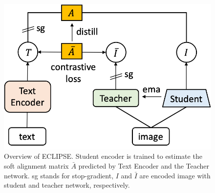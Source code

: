 \begin{figure}
    \centering
    \includegraphics[width=0.8\columnwidth]{figures/imgs/figure_overview.png}
    \vspace{0.7em}
    \caption{Overview of ECLIPSE. Student encoder is trained to estimate the soft alignment matrix $\bar{A}$ predicted by Text Encoder and the Teacher network.
    sg stands for stop-gradient, $I$ and $\bar{I}$ are encoded image with student and teacher network, respectively.
    }
    \label{fig:fig_overview}
\end{figure}